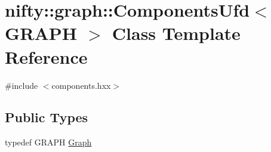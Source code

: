 \hypertarget{classnifty_1_1graph_1_1ComponentsUfd}{}\section{nifty\+:\+:graph\+:\+:Components\+Ufd$<$ G\+R\+A\+P\+H $>$ Class Template Reference}
\label{classnifty_1_1graph_1_1ComponentsUfd}


{\ttfamily \#include $<$components.\+hxx$>$}

\subsection*{Public Types}
\begin{DoxyCompactItemize}
\item 
typedef G\+R\+A\+P\+H \hyperlink{classnifty_1_1graph_1_1ComponentsUfd_afafd21184dee3aecdfa218eb5e72af84}{Graph}
\end{DoxyCompactItemize}
